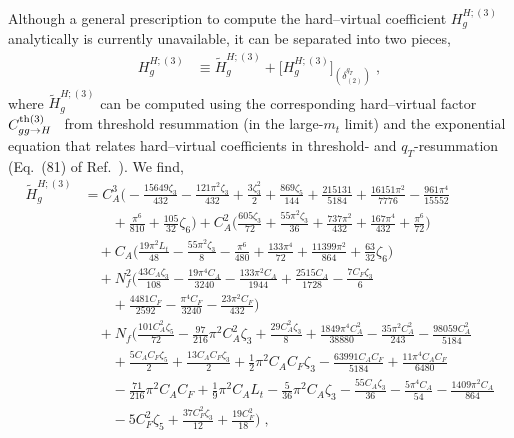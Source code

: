 \documentclass[12pt]{article}
\DeclareRobustCommand{\nn}{\nonumber}
\DeclareRobustCommand{\qt}{\ensuremath{q_T}\xspace}
\begin{document}
Although a general prescription to compute the hard--virtual coefficient $H^{H;(3)}_{g}$ analytically is currently unavailable, it can be separated into two pieces, 
\begin{align}
  H^{H;(3)}_g  
  &\equiv  
  \widetilde{H}^{H;(3)}_{g} + \big[H^{H;(3)}_{g}\big]_{(\delta^{\qt}_{(2)})} \;,
  \label{H3deltaqT2}
\end{align}
where $\widetilde{H}^{H;(3)}_{g}$ can be computed using the corresponding hard--virtual factor $C^{{\rm th}(3)}_{gg\to H}$~\cite{Catani:2014uta} from threshold resummation (in the large-$m_t$ limit) and the exponential equation that relates hard--virtual coefficients in threshold- and $\qt$-resummation (Eq.~(81) of Ref.~\cite{Catani:2013tia}). We find,
\begin{align}
  \widetilde{H}^{H;(3)}_{g}
  &=
  C_{A}^{3} \biggl(
    -\frac{15649 \zeta_{3}}{432}
    -\frac{121 \pi ^2 \zeta_{3}}{432}
    +\frac{3\zeta_{3}^2}{2}
    +\frac{869 \zeta_{ 5}}{144}
    +\frac{215131}{5184}
    +\frac{16151 \pi ^2}{7776}
    -\frac{961\pi ^4}{15552}
    \nn\\&\qquad
    +\frac{\pi ^6}{810}
    +\frac{105}{32} \zeta_{6}
  \biggr)
  + C_{A}^{2} \biggl(
    \frac{605 \zeta_{ 3}}{72}
    +\frac{55 \pi ^2 \zeta_{ 3}}{36}
    +\frac{737 \pi ^2}{432}
    +\frac{167 \pi ^4}{432}
    +\frac{\pi^6}{72}
  \biggr) 
  \nn\\&\quad
  + C_{A} \biggl( 
    \frac{19 \pi ^2  L_{t}}{48}
    -\frac{55 \pi ^2 \zeta _{3}}{8}
    -\frac{\pi ^6}{480}
    +\frac{133 \pi ^4}{72}
    +\frac{11399\pi ^2}{864}  
    +\frac{63}{32} \zeta_{6}
  \biggr)
  \nn\\&\quad
  + N_{f}^{2} \biggl( 
    \frac{43 C_{A} \zeta_{ 3}}{108}
    -\frac{19 \pi ^4 C_{A}}{3240}
    -\frac{133 \pi ^2 C_{A}}{1944}
    +\frac{2515C_{A}}{1728}
    -\frac{7 C_{F} \zeta_{ 3}}{6}
    \nn\\&\qquad
    +\frac{4481 C_{F}}{2592}
    -\frac{\pi ^4C_{F}}{3240}
    -\frac{23 \pi ^2 C_{F}}{432} 
  \biggr)
  \nn\\&\quad
  + N_{f} \biggl(
    \frac{101 C_{A}^2 \zeta_{5}}{72}
    -\frac{97}{216} \pi ^2 C_{A}^2 \zeta_{3}
    +\frac{29 C_{A}^2 \zeta_{3}}{8}
    +\frac{1849 \pi ^4 C_{A}^2}{38880}
    -\frac{35 \pi ^2 C_{A}^2}{243}
    -\frac{98059C_{A}^2}{5184}
    \nn\\&\qquad
    +\frac{5 C_{A} C_{F} \zeta _{5}}{2}
    +\frac{13 C_{A} C_{F} \zeta_{3}}{2}
    +\frac{1}{2} \pi ^2 C_{A} C_{F} \zeta _{3}
    -\frac{63991 C_{A} C_{F}}{5184}
    +\frac{11 \pi ^4C_{A} C_{F}}{6480}
    \nn\\&\qquad
    -\frac{71}{216} \pi ^2 C_{A} C_{F}
    +\frac{1}{9} \pi ^2 C_{A}L_{t}
    -\frac{5}{36} \pi ^2 C_{A} \zeta _{3}
    -\frac{55 C_{A} \zeta_{ 3}}{36}
    -\frac{5 \pi ^4C_{A}}{54}
    -\frac{1409 \pi ^2 C_{A}}{864}
    \nn\\&\qquad
    -5 C_{F}^2 \zeta_{ 5}
    +\frac{37 C_{F}^2 \zeta_{3}}{12}
    +\frac{19 C_{F}^2}{18}
  \biggr) \;,
  \label{H3approx}
\end{align}
\end{document}
